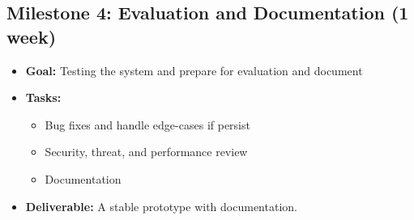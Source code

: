 \documentclass[letterpaper,11pt]{article}
\begin{document}
\subsection{Milestone 4: Evaluation and Documentation (1 week)}
\begin{itemize}
    \item \textbf{Goal:} Testing the system and prepare for evaluation and document
    \item \textbf{Tasks:}
    \begin{itemize}
        \item Bug fixes and handle edge-cases if persist
        \item Security, threat, and performance review
        \item Documentation
    \end{itemize}
    \item \textbf{Deliverable:} A stable prototype with documentation.
\end{itemize}
\end{document}
